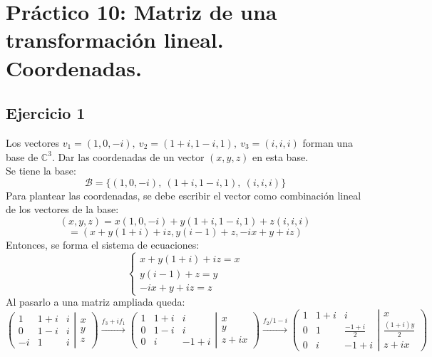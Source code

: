\documentclass[a4paper,12pt]{article}
\begin{document}
\section{Práctico 10: Matriz de una transformación lineal. Coordenadas.}
\subsection{Ejercicio 1}
Los vectores $v_1=(1,0,-i), \ v_2=(1+i,1-i,1), \ v_3=(i,i,i)$ forman una base de $\mathds{C}^3$. Dar las coordenadas de un vector $(x,y,z)$ en esta base. \\    
Se tiene la base:
$$
\mathcal{B}=\{ (1,0,-i), \ (1+i,1-i,1), \ (i,i,i) \}
$$
Para plantear las coordenadas, se debe escribir el vector como combinación lineal de los vectores de la base:
$$
(x,y,z)=x(1,0,-i)+y(1+i,1-i,1)+z(i,i,i)
$$
$$
= (x+y(1+i)+iz, y(i-1)+z, -ix+y+iz)
$$
Entonces, se forma el sistema de ecuaciones:
$$
\begin{cases}
    x+y(1+i)+iz=x \\
    y(i-1)+z=y \\
    -ix+y+iz=z
\end{cases}
$$
Al pasarlo a una matriz ampliada queda:
$$
\left ( \left.\begin{matrix}
    1 & 1+i & i \\ 
    0 & 1-i & i \\ 
    -i & 1 & i
    \end{matrix}\right| \begin{matrix}
    x \\ 
    y \\ 
    z
    \end{matrix}\right )
\xrightarrow[]{f_3+if_1}
\left ( \left.\begin{matrix}
    1 & 1+i & i \\ 
    0 & 1-i & i \\ 
    0 & i & -1+i
    \end{matrix}\right| \begin{matrix}
    x \\ 
    y \\ 
    z+ix
\end{matrix}\right )
\xrightarrow[]{f_2/1-i}
\left ( \left.\begin{matrix}
    1 & 1+i & i \\ 
    0 & 1 & \frac{-1+i}{2} \\ 
    0 & i & -1+i
    \end{matrix}\right| \begin{matrix}
    x \\ 
    \frac{(1+i)y}{2} \\ 
    z+ix
\end{matrix}\right )
$$
\end{document}
